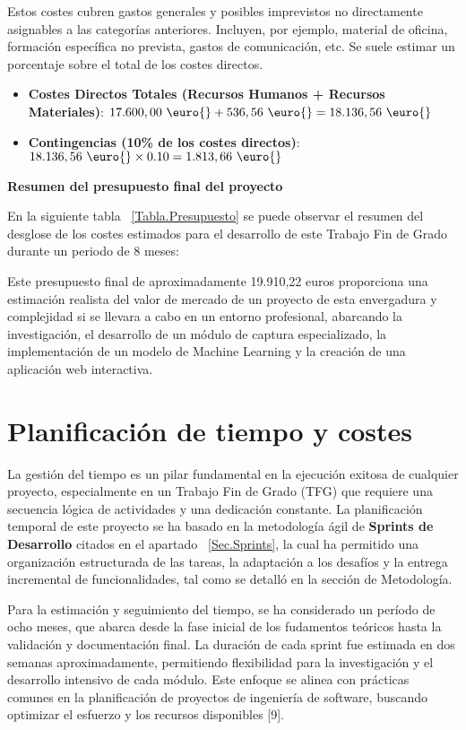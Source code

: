 Estos costes cubren gastos generales y posibles imprevistos no directamente asignables a las categorías anteriores. Incluyen, por ejemplo, material de oficina, formación específica no prevista, gastos de comunicación, etc. Se suele estimar un porcentaje sobre el total de los costes directos.
\begin{itemize}
    \item\textbf{Costes Directos Totales (Recursos Humanos + Recursos Materiales)}: $\displaystyle 17.600,00 \text{ \euro{}} + 536,56 \text{ \euro{}} = 18.136,56 \text{ \euro{}}$
    
    \item\textbf{Contingencias (10\% de los costes directos)}:$\displaystyle 18.136,56 \text{ \euro{}} \times 0.10 = 1.813,66 \text{ \euro{}}$
\end{itemize}

\textbf{Resumen del presupuesto final del proyecto}

En la siguiente tabla ~\ref{Tabla.Presupuesto} se puede observar el resumen del desglose de los costes estimados para el desarrollo de este Trabajo Fin de Grado durante un periodo de 8 meses:



Este presupuesto final de aproximadamente 19.910,22 euros proporciona una estimación realista del valor de mercado de un proyecto de esta envergadura y complejidad si se llevara a cabo en un entorno profesional, abarcando la investigación, el desarrollo de un módulo de captura especializado, la implementación de un modelo de Machine Learning y la creación de una aplicación web interactiva.

\section{Planificación de tiempo y costes}
La gestión del tiempo es un pilar fundamental en la ejecución exitosa de cualquier proyecto, especialmente en un Trabajo Fin de Grado (TFG) que requiere una secuencia lógica de actividades y una dedicación constante. La planificación temporal de este proyecto se ha basado en la metodología ágil de \textbf{Sprints de Desarrollo} citados en el apartado ~\ref{Sec.Sprints}, la cual ha permitido una organización estructurada de las tareas, la adaptación a los desafíos y la entrega incremental de funcionalidades, tal como se detalló en la sección de Metodología.

Para la estimación y seguimiento del tiempo, se ha considerado un período de ocho meses, que abarca desde la fase inicial de los fudamentos teóricos hasta la validación y documentación final. La duración de cada sprint fue estimada en dos semanas aproximadamente, permitiendo flexibilidad para la investigación y el desarrollo intensivo de cada módulo. Este enfoque se alinea con prácticas comunes en la planificación de proyectos de ingeniería de software, buscando optimizar el esfuerzo y los recursos disponibles [9].

